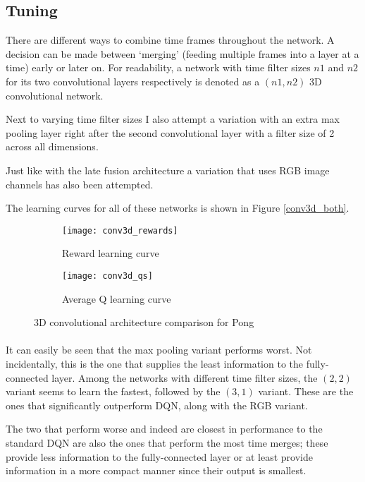 \subsection{Tuning}
\label{sub:conv3d_tuning}
There are different ways to combine time frames throughout the network.
A decision can be made between `merging'
(feeding multiple frames into a layer at a time)
early or later on.
For readability,
a network with time filter sizes
$n1$ and $n2$ for its two convolutional layers respectively
is denoted as a $(n1, n2)$ 3D convolutional network.

Next to varying time filter sizes
I also attempt a variation with an extra max pooling layer
right after the second convolutional layer
with a filter size of 2 across all dimensions.

Just like with the late fusion architecture
a variation that uses RGB image channels has also been attempted.

The learning curves for all of these networks
is shown in Figure \ref{conv3d_both}.

\begin{figure}[htpb]
  \centering
  \begin{subfigure}[t]{.49\linewidth}
    \caption{Reward learning curve}
    \texttt{[image: conv3d\_rewards]}
  \end{subfigure}
  \begin{subfigure}[t]{.49\linewidth}
    \caption{Average Q learning curve}
    \texttt{[image: conv3d\_qs]}
  \end{subfigure}
  \caption[3D Conv DQN comparison]{
    3D convolutional architecture comparison for Pong
  }
  \label{fig:conv3d_both}
\end{figure}

\paragraph{}
It can easily be seen that the max pooling variant
performs worst.
Not incidentally,
this is the one that supplies the least information
to the fully-connected layer.
Among the networks with different time filter sizes,
the $(2,2)$ variant seems to learn the fastest,
followed by the $(3,1)$ variant.
These are the ones that significantly outperform DQN,
along with the RGB variant.

The two that perform worse and indeed
are closest in performance to the standard DQN
are also the ones that perform the most time merges;
these provide less information to the fully-connected layer
or at least provide information in a more compact manner
since their output is smallest.

